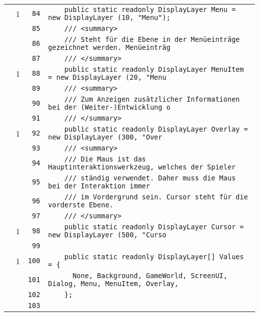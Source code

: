 \documentclass[a4paper,10pt]{article}
\begin{document}
\begin{longtable}[l]{lrrl}
\cellcolor{green} & 1 & \verb~84~ & \verb~    public static readonly DisplayLayer Menu = new DisplayLayer (10, "Menu");~\\
\cellcolor{gray} &  & \verb~85~ & \verb~    /// <summary>~\\
\cellcolor{gray} &  & \verb~86~ & \verb~    /// Steht für die Ebene in der Menüeinträge gezeichnet werden. Menüeinträg~\\
\cellcolor{gray} &  & \verb~87~ & \verb~    /// </summary>~\\
\cellcolor{green} & 1 & \verb~88~ & \verb~    public static readonly DisplayLayer MenuItem = new DisplayLayer (20, "Menu~\\
\cellcolor{gray} &  & \verb~89~ & \verb~    /// <summary>~\\
\cellcolor{gray} &  & \verb~90~ & \verb~    /// Zum Anzeigen zusätzlicher Informationen bei der (Weiter-)Entwicklung o~\\
\cellcolor{gray} &  & \verb~91~ & \verb~    /// </summary>~\\
\cellcolor{green} & 1 & \verb~92~ & \verb~    public static readonly DisplayLayer Overlay = new DisplayLayer (300, "Over~\\
\cellcolor{gray} &  & \verb~93~ & \verb~    /// <summary>~\\
\cellcolor{gray} &  & \verb~94~ & \verb~    /// Die Maus ist das Hauptinteraktionswerkzeug, welches der Spieler~\\
\cellcolor{gray} &  & \verb~95~ & \verb~    /// ständig verwendet. Daher muss die Maus bei der Interaktion immer~\\
\cellcolor{gray} &  & \verb~96~ & \verb~    /// im Vordergrund sein. Cursor steht für die vorderste Ebene.~\\
\cellcolor{gray} &  & \verb~97~ & \verb~    /// </summary>~\\
\cellcolor{green} & 1 & \verb~98~ & \verb~    public static readonly DisplayLayer Cursor = new DisplayLayer (500, "Curso~\\
\cellcolor{gray} &  & \verb~99~ & \verb~~\\
\cellcolor{green} & 1 & \verb~100~ & \verb~    public static readonly DisplayLayer[] Values = {~\\
\cellcolor{gray} &  & \verb~101~ & \verb~      None, Background, GameWorld, ScreenUI, Dialog, Menu, MenuItem, Overlay, ~\\
\cellcolor{gray} &  & \verb~102~ & \verb~    };~\\
\cellcolor{gray} &  & \verb~103~ & \verb~~\\

\end{longtable}
\end{document}

